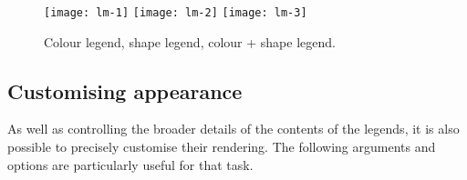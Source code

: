 %
% 
\begin{figure}[htbp]
  \centering
  \texttt{[image: lm-1]}%
  \texttt{[image: lm-2]}%
  \texttt{[image: lm-3]}
  
  \caption{Colour legend, shape legend, colour + shape legend. }
  \label{fig:legend-merge}
\end{figure}

\subsection{Customising appearance}

As well as controlling the broader details of the contents of the legends, it is also possible to precisely customise their rendering.  The following arguments and options are particularly useful for that task.

